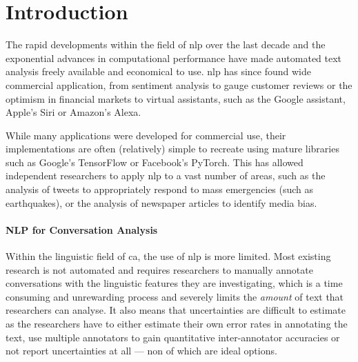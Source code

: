 \newpage
\renewcommand{\headrulewidth}{0.5pt}%
\chapter{Introduction}

The rapid developments within the field of \gls{nlp} over the last decade and the exponential advances in computational performance\cite{mooresLaw} have made automated text analysis freely available and economical to use. \Gls{nlp} has since found wide commercial application, from sentiment analysis to gauge customer reviews or the optimism in financial markets\cite{sentimentReview} to virtual assistants, such as the Google assistant, Apple's Siri or Amazon's Alexa\cite{virtualAssistants}.

While many applications were developed for commercial use, their implementations are often (relatively) simple to recreate using mature libraries such as Google's TensorFlow\cite{abadi2016tensorflow} or Facebook's PyTorch\cite{paszke2019pytorch}. This has allowed independent researchers to apply \gls{nlp} to a vast number of areas, such as the analysis of tweets to appropriately respond to mass emergencies (such as earthquakes)\cite{twitterEmergencies}, or the analysis of newspaper articles to identify media bias\cite{mediaBias}.

\subsubsection{NLP for Conversation Analysis}
Within the linguistic field of \gls{ca}, the use of \gls{nlp} is more limited. 
Most existing research is not automated and requires researchers to manually annotate conversations with the linguistic features they are investigating\cite{daApplications, ap_psychological, ap_trump, ap_interview}, which is a time consuming and unrewarding process and severely limits the \textit{amount} of text that researchers can analyse. It also means that uncertainties are difficult to estimate as the researchers have to either estimate their own error rates in annotating the text, use multiple annotators to gain quantitative inter-annotator accuracies or not report uncertainties at all --- non of which are ideal options.

